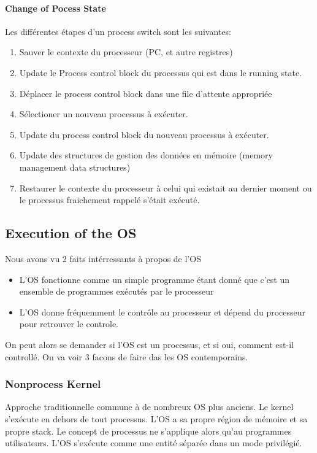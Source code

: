 \paragraph{Change of Pocess State}
Les différentes étapes d'un process switch sont les suivantes:
\begin{enumerate}
  \item Sauver le contexte du processeur (PC, et autre registres)
  \item Update le Process control block du processus qui est dans le running state.
  \item Déplacer le process control block dans une file d'attente appropriée
  \item Sélectioner un nouveau processus à exécuter.
  \item Update du process control block du nouveau processus à exécuter.
  \item Update des structures de gestion des données en mémoire (memory management data structures)
  \item Restaurer le contexte du processeur à celui qui existait au dernier moment ou le processus fraichement rappelé s'était exécuté.
\end{enumerate}

\subsection{Execution of the OS}
Nous avons vu 2 faits intérressants à propos de l'OS
\begin{itemize}
  \item L'OS fonctionne comme un simple programme étant donné que c'est un ensemble de programmes exécutés par le processeur
  \item L'OS donne fréquemment le contrôle au processeur et dépend du processeur pour retrouver le controle.
\end{itemize}
On peut alors se demander si l'OS est un processus, et si oui, comment est-il controllé.
On va voir 3 facons de faire das les OS contemporains.

\subsubsection{Nonprocess Kernel}
Approche traditionnelle commune à de nombreux OS plus anciens.
Le kernel s'exécute en dehors de tout processus.
L'OS a sa propre région de mémoire et sa propre stack.
Le concept de processus ne s'applique alors qu'au programmes utilisateurs.
L'OS s'exécute comme une entité séparée dans un mode privilégié.

